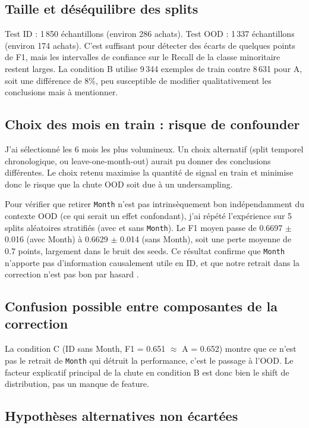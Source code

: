 \documentclass[11pt,a4paper]{article}
\newcommand{\code}[1]{\texttt{\small#1}}
\begin{document}
\subsection*{Taille et déséquilibre des splits}

Test ID : 1\,850 échantillons (environ 286 achats). Test OOD : 1\,337 échantillons (environ 174 achats). C'est suffisant pour détecter des écarts de quelques points de F1, mais les intervalles de confiance sur le Recall de la classe minoritaire restent larges. La condition B utilise 9\,344 exemples de train contre 8\,631 pour A, soit une différence de 8\%, peu susceptible de modifier qualitativement les conclusions mais à mentionner.

\subsection*{Choix des mois en train : risque de confounder}

J'ai sélectionné les 6 mois les plus volumineux. Un choix alternatif (split temporel chronologique, ou leave-one-month-out) aurait pu donner des conclusions différentes. Le choix retenu maximise la quantité de signal en train et minimise donc le risque que la chute OOD soit due à un undersampling.

Pour vérifier que retirer \code{Month} n'est pas \og intrinsèquement bon \fg{} indépendamment du contexte OOD (ce qui serait un effet confondant), j'ai répété l'expérience sur 5 splits aléatoires stratifiés (avec et sans \code{Month}). Le F1 moyen passe de 0.6697 $\pm$ 0.016 (avec Month) à 0.6629 $\pm$ 0.014 (sans Month), soit une perte moyenne de 0.7 points, largement dans le bruit des seeds. Ce résultat confirme que \code{Month} n'apporte pas d'information causalement utile en ID, et que notre retrait dans la correction n'est pas \og bon par hasard \fg{}.

\subsection*{Confusion possible entre composantes de la correction}

La condition C (ID sans Month, F1 = 0.651 $\approx$ A = 0.652) montre que ce n'est pas le retrait de \code{Month} qui détruit la performance, c'est le passage à l'OOD. Le facteur explicatif principal de la chute en condition B est donc bien le shift de distribution, pas un manque de feature.

\subsection*{Hypothèses alternatives non écartées}
\end{document}
